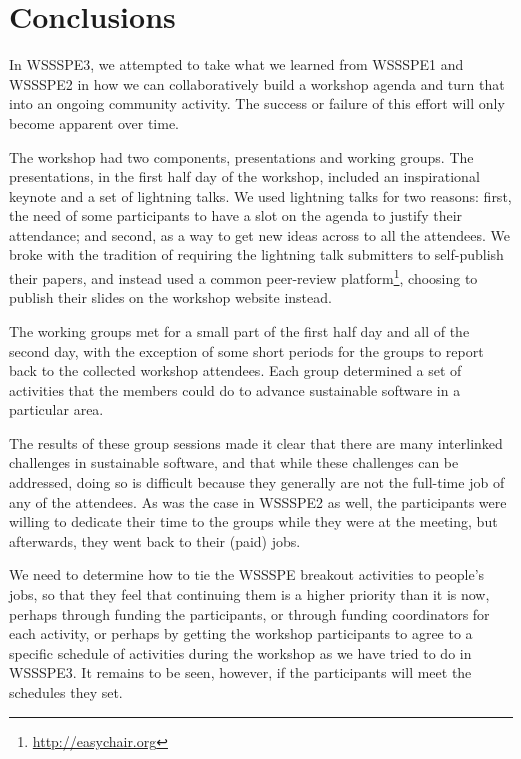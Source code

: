 \documentclass[11pt, oneside]{amsart}
\begin{document}


%









\section{Conclusions} \label{sec:conclusions}

In WSSSPE3, we attempted to take what we learned from WSSSPE1 and WSSSPE2 in how
we can collaboratively build a workshop agenda and turn that into an ongoing
community activity. The success or failure of this effort will only
become apparent over time.

The workshop had two components, presentations and working groups. The
presentations, in the first half day of the workshop, included an inspirational
keynote and a set of lightning talks. We used lightning talks for two reasons:
first, the need of some participants to have a slot on the agenda to justify
their attendance; and second, as a way to get new ideas across to all the
attendees. We broke with the tradition of requiring the lightning talk submitters
to self-publish their papers, and instead used a common peer-review
platform\footnote{\url{http://easychair.org}}, choosing to publish their
slides on the workshop website instead.

The working groups met for a small part of the first half day and all of the
second day, with the exception of some short periods for the groups to report
back to the collected workshop attendees. Each group determined a set
of activities that the members could do to advance sustainable software in
a particular area.

The results of these group sessions made it clear that
there are many interlinked challenges in sustainable software, and that
while these challenges can be addressed, doing so is difficult because they
generally are not the full-time job of any of the attendees. 
As was the case in WSSSPE2 as well, the participants were willing
to dedicate their time to the groups while they were at the meeting, but
afterwards, they went back to their (paid) jobs. 

We need to determine how
to tie the WSSSPE breakout activities to people's jobs, so that they feel that
continuing them is a higher priority than it is now, perhaps through funding the
participants, or through funding coordinators for each activity, or perhaps by
getting the workshop participants to agree to a specific schedule of activities
during the workshop as we have tried to do in WSSSPE3.  It remains to be
seen, however, if the participants will meet the schedules they set.
\end{document}
